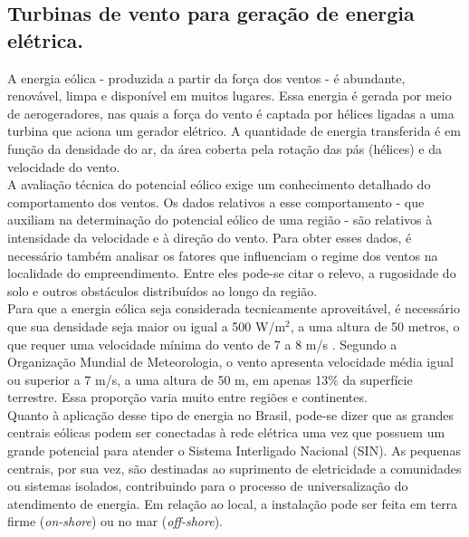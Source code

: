 \subsection{Turbinas de vento para gera\c{c}\~ao de energia el\'etrica.}

A energia e\'olica - produzida a partir da for\c{c}a dos ventos - \'e abundante, renov\'avel, limpa e dispon\'ivel em muitos lugares. Essa energia \'e gerada por meio de aerogeradores, nas quais a for\c{c}a do vento \'e captada por h\'elices ligadas a uma turbina que aciona um gerador el\'etrico. A quantidade de energia transferida \'e em fun\c{c}\~ao da densidade do ar, da \'area coberta pela rota\c{c}\~ao das p\'as (h\'elices) e da velocidade do vento. \\ 

A avalia\c{c}\~ao t\'ecnica do potencial e\'olico exige um conhecimento detalhado do comportamento dos ventos. Os dados relativos a esse comportamento - que auxiliam na determina\c{c}\~ao do potencial e\'olico de uma regi\~ao - s\~ao relativos \`a intensidade da velocidade e \`a dire\c{c}\~ao do vento. Para obter esses dados, \'e necess\'ario tamb\'em analisar os fatores que influenciam o regime dos ventos na localidade do empreendimento. Entre eles pode-se citar o relevo, a rugosidade do solo e outros obst\'aculos distribu\'idos ao longo da regi\~ao. \\ 

Para que a energia e\'olica seja considerada tecnicamente aproveit\'avel, \'e necess\'ario que sua densidade seja maior ou igual a 500 W/m$^{2}$, a uma altura de 50 metros, o que requer uma velocidade m\'inima do vento de 7 a 8 m/s \cite{johansson1993renewable} . Segundo a Organiza\c{c}\~ao Mundial de Meteorologia, o vento apresenta velocidade m\'edia igual ou superior a 7 m/s, a uma altura de 50 m, em apenas 13\% da superf\'icie terrestre. Essa propor\c{c}\~ao varia muito entre regi\~oes e continentes. \\

Quanto \`a aplica\c{c}\~ao desse tipo de energia no Brasil, pode-se dizer que as grandes centrais e\'olicas podem ser conectadas \`a rede el\'etrica uma vez que possuem um grande potencial para atender o Sistema Interligado Nacional (SIN). As pequenas centrais, por sua vez, s\~ao destinadas ao suprimento de eletricidade a comunidades ou sistemas isolados, contribuindo para o processo de universaliza\c{c}\~ao do atendimento de energia. Em rela\c{c}\~ao ao local, a instala\c{c}\~ao pode ser feita em terra firme (\textit{on-shore}) ou no mar (\textit{off-shore}). \\ 

